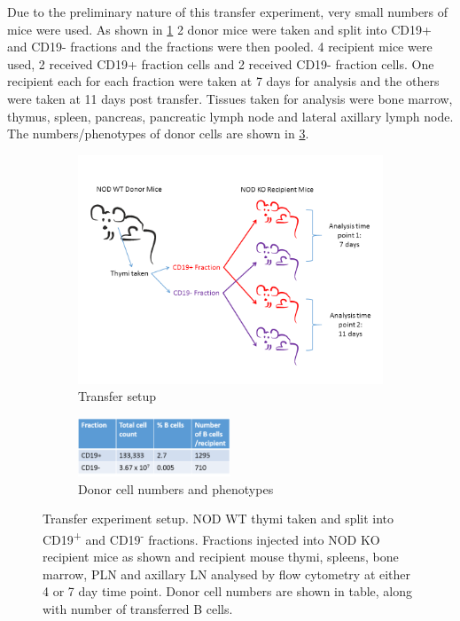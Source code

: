Due to the preliminary nature of this transfer experiment, very small numbers of mice were used.
As shown in \cref{fig:KOtransfersetup} 2 donor mice were taken and split into CD19+ and CD19- fractions and the fractions were then pooled.
4 recipient mice were used, 2 received CD19+ fraction cells and 2 received CD19- fraction cells.
One recipient each for each fraction were taken at 7 days for analysis and the others were taken at 11 days post transfer.
Tissues taken for analysis were bone marrow, thymus, spleen, pancreas, pancreatic lymph node and lateral axillary lymph node.
The numbers/phenotypes of donor cells are shown in \cref{subfig:WTdonortable}.



\begin{figure}
	\begin{subfigure}{\textwidth}
	\includegraphics[width=\textwidth]{Figures/KOTransferexptsetup.png}
	\caption{Transfer setup}
	\label{fig:KOtransfersetup}
	\end{subfigure}
	\begin{subfigure}{\textwidth}
	\centering
	\includegraphics[width=0.5\textwidth]{Figures/WTdonortable2.png}
	\caption{Donor cell numbers and phenotypes}
	\label{subfig:WTdonortable}
	\end{subfigure}
\caption{Transfer experiment setup.
NOD WT thymi taken and split into CD19\textsuperscript{+} and CD19\textsuperscript{-} fractions. 
Fractions injected into NOD KO recipient mice as shown and recipient mouse thymi, spleens, bone marrow, PLN and axillary LN analysed by flow cytometry at either 4 or 7 day time point.
Donor cell numbers are shown in table, along with number of transferred B cells.
}
\end{figure}


